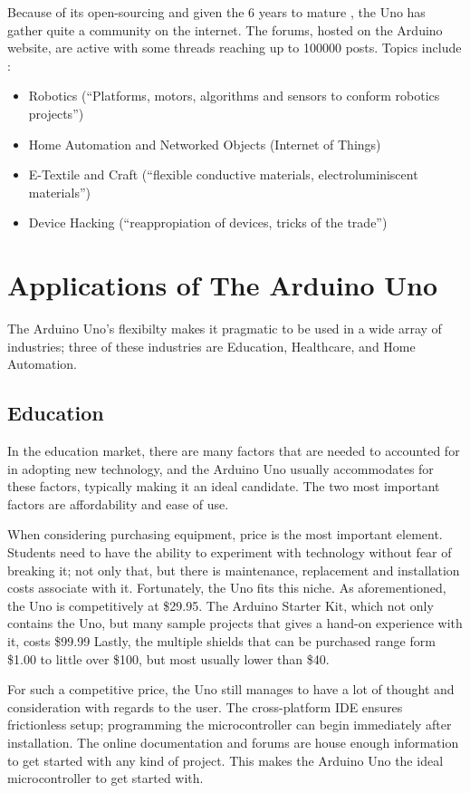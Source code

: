 \documentclass[11pt,letterpaper,twocolumn]{article}
\begin{document}
Because of its open-sourcing and given the \num{6} years to mature \cite{blogpost}, the Uno has gather quite a community on the internet. The forums, hosted on the Arduino website, are active with some threads reaching up to \num{100000} posts. Topics include \cite{forums}:

\begin{itemize}
    \item Robotics (``Platforms, motors, algorithms and sensors to conform robotics projects'')
    \item Home Automation and Networked Objects (Internet of Things)
    \item E-Textile and Craft (``flexible conductive materials, electroluminiscent materials'')
    \item Device Hacking (``reappropiation of devices, tricks of the trade'')
\end{itemize}

\section{Applications of The Arduino Uno}
The Arduino Uno's flexibilty makes it pragmatic to be used in a wide array of industries; three of these industries are Education, Healthcare, and Home Automation.

\subsection{Education}
In the education market, there are many factors that are needed to accounted for in adopting new technology, and the Arduino Uno usually accommodates for these factors, typically making it an ideal candidate. The two most important factors are affordability and ease of use.

When considering purchasing equipment, price is the most important element. Students need to have the ability to experiment with technology without fear of breaking it; not only that, but there is maintenance, replacement and installation costs associate with it. Fortunately, the Uno fits this niche. As aforementioned, the Uno is competitively at \$\num{29.95}. The Arduino Starter Kit, which not only contains the Uno, but many sample projects that gives a hand-on experience with it, costs \$\num{99.99} Lastly, the multiple shields that can be purchased range form \$\num{1.00} to little over \$\num{100}, but most usually lower than \$\num{40}.

For such a competitive price, the Uno still manages to have a lot of thought and consideration with regards to the user. The cross-platform IDE ensures frictionless setup; programming the microcontroller can begin immediately after installation. The online documentation and forums are house enough information to get started with any kind of project. This makes the Arduino Uno the ideal microcontroller to get started with.
\end{document}
